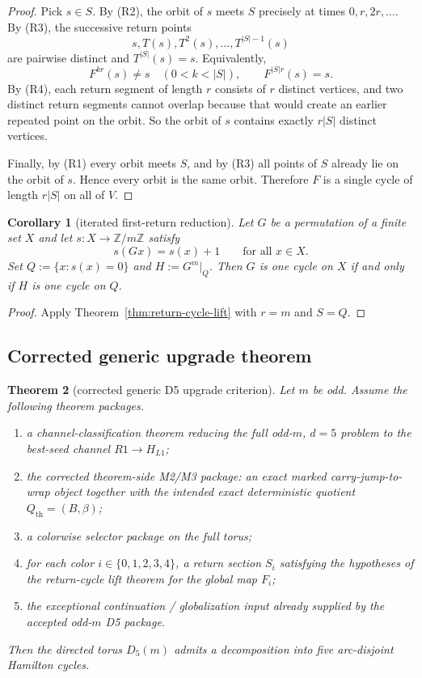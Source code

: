 \documentclass[11pt]{article}
\newtheorem{theorem}{Theorem}[section]
\newtheorem{corollary}[theorem]{Corollary}
\newcommand{\Z}{\mathbb Z}
\begin{document}
\begin{proof}
Pick $s\in S$.
By (R2), the orbit of $s$ meets $S$ precisely at times $0,r,2r,\dots$.
By (R3), the successive return points
\[
s,T(s),T^2(s),\dots,T^{|S|-1}(s)
\]
are pairwise distinct and $T^{|S|}(s)=s$.
Equivalently,
\[
F^{kr}(s)\neq s\quad (0<k<|S|),
\qquad
F^{|S|r}(s)=s.
\]
By (R4), each return segment of length $r$ consists of $r$ distinct vertices,
and two distinct return segments cannot overlap because that would create an
earlier repeated point on the orbit. So the orbit of $s$ contains exactly
$r|S|$ distinct vertices.

Finally, by (R1) every orbit meets $S$, and by (R3) all points of $S$ already
lie on the orbit of $s$. Hence every orbit is the same orbit.
Therefore $F$ is a single cycle of length $r|S|$ on all of $V$.
\end{proof}

\begin{corollary}[iterated first-return reduction]
\label{cor:iterated-first-return}
Let $G$ be a permutation of a finite set $X$ and let $s:X\to\Z/m\Z$ satisfy
\[
s(Gx)=s(x)+1
\qquad\text{for all }x\in X.
\]
Set $Q:=\{x:s(x)=0\}$ and $H:=G^m|_Q$. Then $G$ is one cycle on $X$ if and
only if $H$ is one cycle on $Q$.
\end{corollary}

\begin{proof}
Apply Theorem~\ref{thm:return-cycle-lift} with $r=m$ and $S=Q$.
\end{proof}

\subsection{Corrected generic upgrade theorem}

\begin{theorem}[corrected generic D5 upgrade criterion]
\label{thm:generic-upgrade}
Let $m$ be odd.
Assume the following theorem packages.
\begin{enumerate}[label=\textup{(G\arabic*)},leftmargin=2.9em]
\item a channel-classification theorem reducing the full odd-$m$, $d=5$
      problem to the best-seed channel $R1\to H_{L1}$;
\item the corrected theorem-side M2/M3 package: an exact marked carry-jump-to-wrap
      object together with the intended exact deterministic quotient
      $Q_{\mathrm{th}}=(B,\beta)$;
\item a colorwise selector package on the full torus;
\item for each color $i\in\{0,1,2,3,4\}$, a return section $S_i$ satisfying
      the hypotheses of the return-cycle lift theorem for the global map $F_i$;
\item the exceptional continuation / globalization input already supplied by the
      accepted odd-$m$ D5 package.
\end{enumerate}
Then the directed torus $D_5(m)$ admits a decomposition into five arc-disjoint
Hamilton cycles.
\end{theorem}
\end{document}
